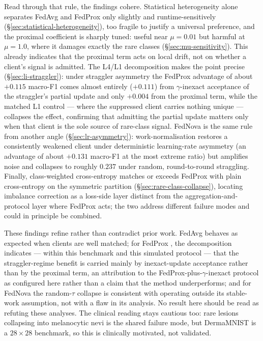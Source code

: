 \documentclass[11pt,a4paper]{report}
\begin{document}
Read through that rule, the findings cohere. Statistical heterogeneity alone
separates FedAvg and FedProx only slightly and runtime-sensitively
(\S\ref{sec:statistical-heterogeneity}), too fragile to justify a universal
preference, and the proximal coefficient is sharply tuned: useful near
$\mu = 0.01$ but harmful at $\mu = 1.0$, where it damages exactly the rare classes
(\S\ref{sec:mu-sensitivity}). This already indicates that the proximal term acts
on local drift, not on whether a client's signal is admitted. The L4/L1
decomposition makes the point precise (\S\ref{sec:li-straggler}): under straggler
asymmetry the FedProx advantage of about $+0.115$ macro-F1 comes almost entirely
($+0.111$) from $\gamma$-inexact acceptance of the straggler's partial update and
only $+0.004$ from the proximal term, while the matched L1 control --- where the
suppressed client carries nothing unique --- collapses the effect, confirming that
admitting the partial update matters only when that client is the sole source of
rare-class signal. FedNova is the same rule from another angle
(\S\ref{sec:lr-asymmetry}): work-normalisation restores a consistently weakened
client under deterministic learning-rate asymmetry (an advantage of about
$+0.131$ macro-F1 at the most extreme ratio) but amplifies noise and collapses to
roughly $0.237$ under random, round-to-round straggling. Finally, class-weighted
cross-entropy matches or exceeds FedProx with plain cross-entropy on the symmetric
partition (\S\ref{sec:rare-class-collapse}), locating imbalance correction as a
loss-side layer distinct from the aggregation-and-protocol layer where FedProx
acts; the two address different failure modes and could in principle be combined.

These findings refine rather than contradict prior work. FedAvg
\citep{mcmahan2017fedavg} behaves as expected when clients are well matched; for
FedProx \citep{li2020fedprox}, the decomposition indicates --- within this
benchmark and this simulated protocol --- that the straggler-regime benefit is
carried mainly by inexact-update acceptance rather than by the proximal term, an
attribution to the FedProx-plus-$\gamma$-inexact protocol as configured here
rather than a claim that the method underperforms; and for FedNova
\citep{wang2020fednova} the random-$\tau$ collapse is consistent with operating
outside its stable-work assumption, not with a flaw in its analysis. No result
here should be read as refuting these analyses. The clinical reading stays
cautious too: rare lesions collapsing into melanocytic nevi is the shared failure
mode, but DermaMNIST is a $28 \times 28$ benchmark, so this is clinically
motivated, not validated.
\end{document}
